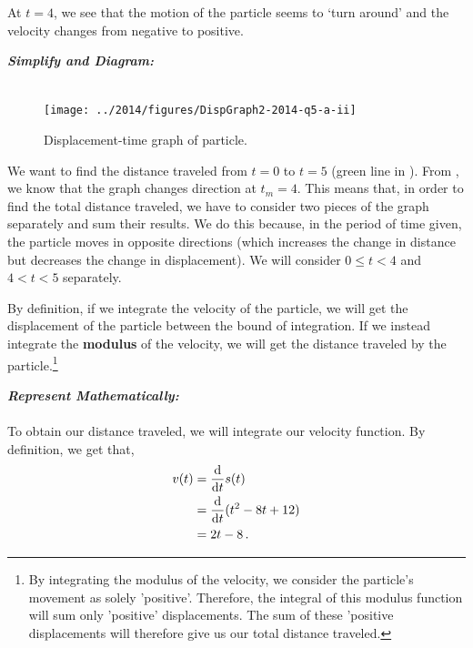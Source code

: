 \begin{subquestions}
\begin{subsubquestions}
		At $t=4$, we see that the motion of the particle seems to `turn around' and the velocity changes from negative to positive. 
		
		
		\subsubquestion
		
		\begin{subsubsubquestions}
			
			\subsubsubquestion
			
			\textbf{\textit{Simplify and Diagram:}} \\ \\
			
			\begin{figure}[H]
				\begin{center}
					\texttt{[image: ../2014/figures/DispGraph2-2014-q5-a-ii]}
					\caption{\label{2014:q5*:SGraph2} Displacement-time graph of particle.}
				\end{center}
			\end{figure}
			
			We want to find the distance traveled from $t=0$ to $t=5$ (green line in ). From , we know that the graph changes direction at $t_m=4$. This means that, in order to find the total distance traveled, we have to consider two pieces of the graph separately and sum their results. We do this because, in the period of time given, the particle moves in opposite directions (which increases the change in distance but decreases the change in displacement). We will consider $0 \leq t < 4$ and $4 < t < 5$ separately.
			
			By definition, if we integrate the velocity of the particle, we will get the displacement of the particle between the bound of integration. If we instead integrate the \textbf{modulus} of the velocity, we will get the distance traveled by the particle.\footnote{By integrating the modulus of the velocity, we consider the particle's movement as solely 'positive'. Therefore, the integral of this modulus function will sum only 'positive' displacements. The sum of these 'positive displacements will therefore give us our total distance traveled.}
			
			
			
			\textbf{\textit{Represent Mathematically:}} \\ \\
			To obtain our distance traveled, we will integrate our velocity function. By definition, we get that,
			\begin{align}
				v(t) & = \frac{\mathrm{d}}{\mathrm{d}t}s(t) \nonumber \\ 
				     & = \frac{\mathrm{d}}{\mathrm{d}t}(t^2-8t+12) \nonumber \\
				     & = 2t-8 \,.
			\end{align}
			

\end{subsubsubquestions}
\end{subsubquestions}
\end{subquestions}
